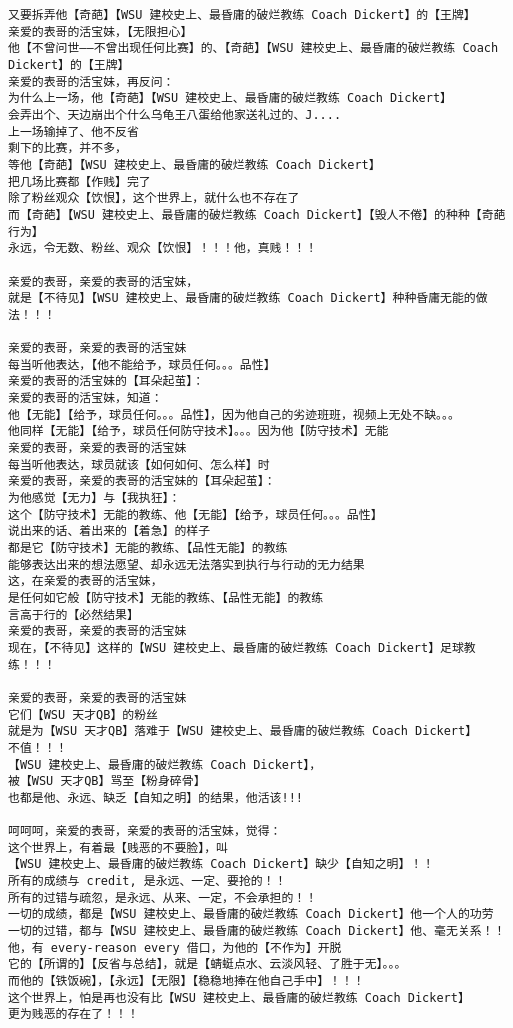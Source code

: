 \documentclass[9pt, b5paper]{article}
\begin{document}
\begin{verbatim}
又要拆弄他【奇葩】【WSU 建校史上、最昏庸的破烂教练 Coach Dickert】的【王牌】
亲爱的表哥的活宝妹，【无限担心】
他【不曾问世——不曾出现任何比赛】的、【奇葩】【WSU 建校史上、最昏庸的破烂教练 Coach Dickert】的【王牌】
亲爱的表哥的活宝妹，再反问：
为什么上一场，他【奇葩】【WSU 建校史上、最昏庸的破烂教练 Coach Dickert】
会弄出个、天边崩出个什么乌龟王八蛋给他家送礼过的、J....
上一场输掉了、他不反省
剩下的比赛，并不多，
等他【奇葩】【WSU 建校史上、最昏庸的破烂教练 Coach Dickert】
把几场比赛都【作贱】完了
除了粉丝观众【饮恨】，这个世界上，就什么也不存在了
而【奇葩】【WSU 建校史上、最昏庸的破烂教练 Coach Dickert】【毁人不倦】的种种【奇葩行为】
永远，令无数、粉丝、观众【饮恨】！！！他，真贱！！！

亲爱的表哥，亲爱的表哥的活宝妹，
就是【不待见】【WSU 建校史上、最昏庸的破烂教练 Coach Dickert】种种昏庸无能的做法！！！

亲爱的表哥，亲爱的表哥的活宝妹
每当听他表达，【他不能给予，球员任何。。。品性】
亲爱的表哥的活宝妹的【耳朵起茧】：
亲爱的表哥的活宝妹，知道：
他【无能】【给予，球员任何。。。品性】，因为他自己的劣迹班班，视频上无处不缺。。。
他同样【无能】【给予，球员任何防守技术】。。。因为他【防守技术】无能
亲爱的表哥，亲爱的表哥的活宝妹
每当听他表达，球员就该【如何如何、怎么样】时
亲爱的表哥，亲爱的表哥的活宝妹的【耳朵起茧】：
为他感觉【无力】与【我执狂】：
这个【防守技术】无能的教练、他【无能】【给予，球员任何。。。品性】
说出来的话、着出来的【着急】的样子
都是它【防守技术】无能的教练、【品性无能】的教练
能够表达出来的想法愿望、却永远无法落实到执行与行动的无力结果
这，在亲爱的表哥的活宝妹，
是任何如它般【防守技术】无能的教练、【品性无能】的教练
言高于行的【必然结果】
亲爱的表哥，亲爱的表哥的活宝妹
现在，【不待见】这样的【WSU 建校史上、最昏庸的破烂教练 Coach Dickert】足球教练！！！

亲爱的表哥，亲爱的表哥的活宝妹
它们【WSU 天才QB】的粉丝
就是为【WSU 天才QB】落难于【WSU 建校史上、最昏庸的破烂教练 Coach Dickert】
不值！！！
【WSU 建校史上、最昏庸的破烂教练 Coach Dickert】，
被【WSU 天才QB】骂至【粉身碎骨】
也都是他、永远、缺乏【自知之明】的结果，他活该!!!

呵呵呵，亲爱的表哥，亲爱的表哥的活宝妹，觉得：
这个世界上，有着最【贱恶的不要脸】，叫
【WSU 建校史上、最昏庸的破烂教练 Coach Dickert】缺少【自知之明】！！
所有的成绩与 credit, 是永远、一定、要抢的！！
所有的过错与疏忽，是永远、从来、一定，不会承担的！！
一切的成绩，都是【WSU 建校史上、最昏庸的破烂教练 Coach Dickert】他一个人的功劳
一切的过错，都与【WSU 建校史上、最昏庸的破烂教练 Coach Dickert】他、毫无关系！！
他，有 every-reason every 借口，为他的【不作为】开脱
它的【所谓的】【反省与总结】，就是【蜻蜓点水、云淡风轻、了胜于无】。。。
而他的【铁饭碗】，【永远】【无限】【稳稳地捧在他自己手中】！！！
这个世界上，怕是再也没有比【WSU 建校史上、最昏庸的破烂教练 Coach Dickert】
更为贱恶的存在了！！！


\end{verbatim}
\end{document}
